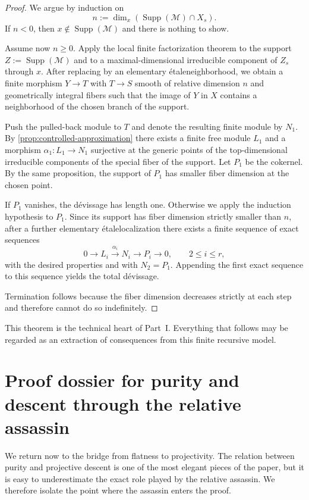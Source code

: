 \documentclass[11pt,oneside]{article}
\newcommand{\M}{\mathcal M}
\newcommand{\Supp}{\operatorname{Supp}}
\newcommand{\etale}{\'etale}
\begin{document}
\begin{proof}
We argue by induction on
\[
 n:=\dim_x(\Supp(\M)\cap X_s).
\]
If $n<0$, then $x\notin\Supp(\M)$ and there is nothing to show.

Assume now $n\ge 0$.  Apply the local finite factorization theorem to the support $Z:=\Supp(\M)$ and to a maximal-dimensional irreducible component of $Z_s$ through $x$.  After replacing by an elementary \etale neighborhood, we obtain a finite morphism $Y\to T$ with $T\to S$ smooth of relative dimension $n$ and geometrically integral fibers such that the image of $Y$ in $X$ contains a neighborhood of the chosen branch of the support.

Push the pulled-back module to $T$ and denote the resulting finite module by $N_1$.  By \cref{prop:controlled-approximation} there exists a finite free module $L_1$ and a morphism $\alpha_1\colon L_1\to N_1$ surjective at the generic points of the top-dimensional irreducible components of the special fiber of the support.  Let $P_1$ be the cokernel.  By the same proposition, the support of $P_1$ has smaller fiber dimension at the chosen point.

If $P_1$ vanishes, the d\'evissage has length one.  Otherwise we apply the induction hypothesis to $P_1$.  Since its support has fiber dimension strictly smaller than $n$, after a further elementary \etale localization there exists a finite sequence of exact sequences
\[
0\to L_i\xrightarrow{\alpha_i}N_i\to P_i\to 0,
\qquad 2\le i\le r,
\]
with the desired properties and with $N_2=P_1$.  Appending the first exact sequence to this sequence yields the total d\'evissage.

Termination follows because the fiber dimension decreases strictly at each step and therefore cannot do so indefinitely.
\end{proof}

This theorem is the technical heart of Part~I.  Everything that follows may be regarded as an extraction of consequences from this finite recursive model.

\section{Proof dossier for purity and descent through the relative assassin}

We return now to the bridge from flatness to projectivity.  The relation between purity and projective descent is one of the most elegant pieces of the paper, but it is easy to underestimate the exact role played by the relative assassin.  We therefore isolate the point where the assassin enters the proof.
\end{document}
